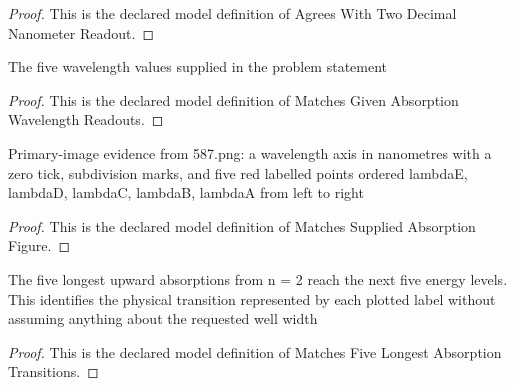 \begin{proof}
  This is the declared model definition of Agrees With Two Decimal Nanometer Readout.
\end{proof}
\begin{definition}
  \label{def:physics:phyx-mini-0587:phyxminiproblems-problemphyxmini0587-matchesgivenabsorptionwavelengthreadouts}
  The five wavelength values supplied in the problem statement
\end{definition}
\begin{proof}
  This is the declared model definition of Matches Given Absorption Wavelength Readouts.
\end{proof}
\begin{definition}
  \label{def:physics:phyx-mini-0587:phyxminiproblems-problemphyxmini0587-matchessuppliedabsorptionfigure}
  Primary-image evidence from 587.png: a wavelength axis in nanometres with a zero tick, subdivision marks, and five red labelled points ordered lambdaE, lambdaD, lambdaC, lambdaB, lambdaA from left to right
\end{definition}
\begin{proof}
  This is the declared model definition of Matches Supplied Absorption Figure.
\end{proof}
\begin{definition}
  \label{def:physics:phyx-mini-0587:phyxminiproblems-problemphyxmini0587-matchesfivelongestabsorptiontransitions}
  The five longest upward absorptions from n = 2 reach the next five energy levels. This identifies the physical transition represented by each plotted label without assuming anything about the requested well width
\end{definition}
\begin{proof}
  This is the declared model definition of Matches Five Longest Absorption Transitions.
\end{proof}
